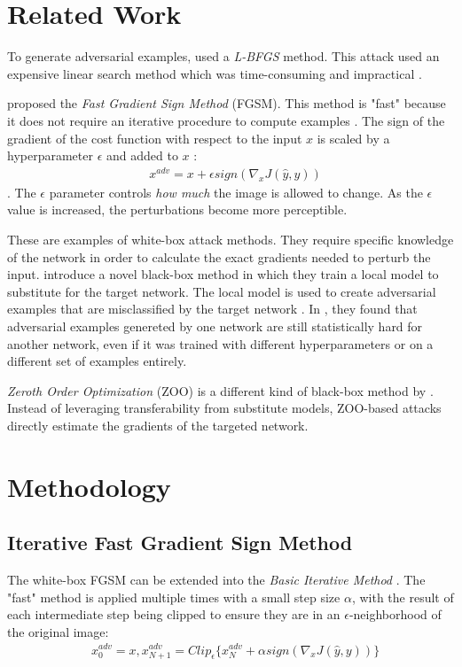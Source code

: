 \documentclass[12pt]{article}
\begin{document}
\section{Related Work}
To generate adversarial examples, \cite{szegedy2013intriguing} used a \emph{L-BFGS} method.
This attack used an expensive linear search method which was time-consuming and impractical \cite{yuan2017adversarial}.

\cite{goodfellow2014explaining} proposed the \emph{Fast Gradient Sign Method} (FGSM).
This method is "fast" because it does not require an iterative procedure to compute examples \cite{kurakin2016adversarial}.
The sign of the gradient of the cost function with respect to the input $x$ is scaled by a hyperparameter $\epsilon$ and added to $x$ :
\begin{align*}
	& x^{adv} = x + \epsilon sign(\nabla_xJ(\hat{y}, y))
\end{align*} \cite{goodfellow2014explaining}.
The $\epsilon$ parameter controls \emph{how much} the image is allowed to change.
As the $\epsilon$ value is increased, the perturbations become more perceptible.

These are examples of white-box attack methods.
They require specific knowledge of the network in order to calculate the exact gradients needed to perturb the input.
\cite{papernot2016practical} introduce a novel black-box method in which they train a local model to substitute for the target network.
The local model is used to create adversarial examples that are misclassified by the target network \cite{papernot2016practical}.
In \cite{szegedy2013intriguing}, they found that adversarial examples genereted by one network are still statistically hard for another network, even if it was trained with different hyperparameters or on a different set of examples entirely.

\emph{Zeroth Order Optimization} (ZOO) is a different kind of black-box method by \cite{chen2017zoo}.
Instead of leveraging transferability from substitute models, ZOO-based attacks directly estimate the gradients of the targeted network.

\section{Methodology}
\subsection{Iterative Fast Gradient Sign Method}
The white-box FGSM can be extended into the \emph{Basic Iterative Method} \cite{kurakin2016adversarial}.
The "fast" method is applied multiple times with a small step size $\alpha$, with the result of each intermediate step being clipped to ensure they are in an $\epsilon$-neighborhood of the original image:
\begin{align*}
	& x_{0}^{adv} = x, x_{N+1}^{adv} = Clip_{\epsilon}\{x_{N}^{adv} + \alpha sign(\nabla_xJ(\hat{y}, y))\}
\end{align*}
\end{document}
